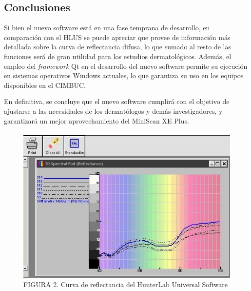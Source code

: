 \documentclass[conference]{IEEEtran}
\begin{document}
	\subsection{Conclusiones}
	Si bien el nuevo software est\'{a} en una fase temprana de desarrollo, en comparaci\'{o}n con el HLUS se puede apreciar que provee de informaci\'{o}n m\'{a}s detallada sobre la curva de reflectancia difusa, lo que sumado al resto de las funciones ser\'{a} de gran utilidad para los estudios dermatol\'{o}gicos. Adem\'{a}s, el empleo del \textit{framework} Qt en el desarrollo del nuevo software permite su ejecuci\'{o}n en sistemas operativos Windows actuales, lo que garantiza su uso en los equipos disponibles en el CIMBUC.

	En definitiva, se concluye que el nuevo software cumplir\'{a} con el objetivo de ajustarse a las necesidades de los dermat\'{o}logos y dem\'{a}s investigadores, y garantizar\'{a} un mejor aprovechamiento del MiniScan XE Plus.

		\begin{figure}[H]
			\centering
			\label{figura_2}
			\includegraphics[scale=0.56]{img/HunterLabSoftware}
			\caption{FIGURA 2. Curva de reflectancia del HunterLab Universal Software}
		\end{figure}
	
\end{document}
